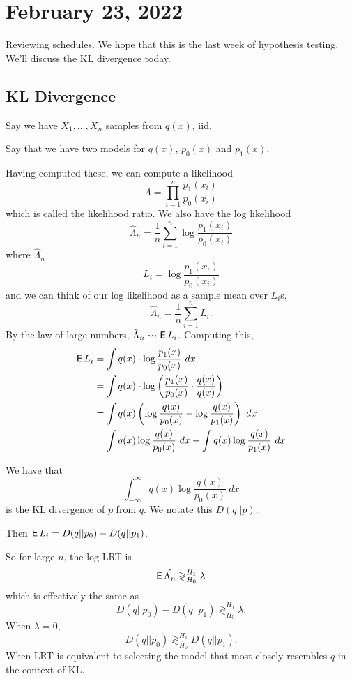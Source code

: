 \section{February 23, 2022}

Reviewing schedules. We hope that this is the last week of hypothesis testing. We'll discuss the KL divergence today.

\subsection{KL Divergence}
Say we have $X_1, \dots, X_n$ samples from $q(x)$, iid.

Say that we have two models for $q(x)$, $p_0(x)$ and $p_1(x)$.

Having computed these, we can compute a likelihood
\[\Lambda = \prod^n_{i=1}\frac{p_1(x_i)}{p_0(x_i)}\]
which is called the likelihood ratio. We also have the log likelihood
\[\hat{\Lambda}_n = \frac{1}{n}\sum^n_{i=1}\log \frac{p_1(x_i)}{p_0(x_i)}\]
where $\hat{\Lambda}_n$
\[L_i = \log \frac{p_1(x_i)}{p_0(x_i)}\]
and we can think of our log likelihood as a sample mean over $L_i$s,
\[\hat{\Lambda}_n = \frac{1}{n}\sum^n_{i=1}L_i.\]
By the law of large numbers, $\hat{\Lambda}_n\rightsquigarrow \operatorname{\mathsf{E}} L_i$. Computing this,
\begin{align*}
    \E L_i
     & = \int q(x)\cdot \log \frac{p_1(x)}{p_0(x)}\ dx                                     \\
     & = \int q(x)\cdot \log \left( \frac{p_1(x)}{p_0(x)} \cdot \frac{q(x)}{q(x)} \right)  \\
     & = \int q(x) \left( \log \frac{q(x)}{p_0(x)} - \log \frac{q(x)}{p_1(x)}  \right)\ dx \\
     & = \int q(x) \log \frac{q(x)}{p_0(x)}\ dx - \int q(x) \log \frac{q(x)}{p_1(x)}\ dx
\end{align*}
\begin{definition}[KL Divergence]
    We have that
    \[\int_{-\infty}^\infty q(x) \log \frac{q(x)}{p_0(x)}\ dx\]
    is the KL divergence of $p$ from $q$. We notate this $D(q||p)$.
\end{definition}
Then $\operatorname{\mathsf{E}} L_i = D(q||p_0) - D(q||p_1)$.

So for large $n$, the log LRT is
\[\operatorname{\mathsf{E}} \hat{\Lambda_n} \gtrless^{H_1}_{H_0} \lambda\]
which is effectively the same as
\[D(q||p_0) - D(q||p_1) \gtrless^{H_1}_{H_0} \lambda.\]
When $\lambda = 0$,
\[D(q||p_0) \gtrless^{H_1}_{H_0} D(q||p_1).\]
When LRT is equivalent to selecting the model that most closely resembles $q$ in the context of KL.

